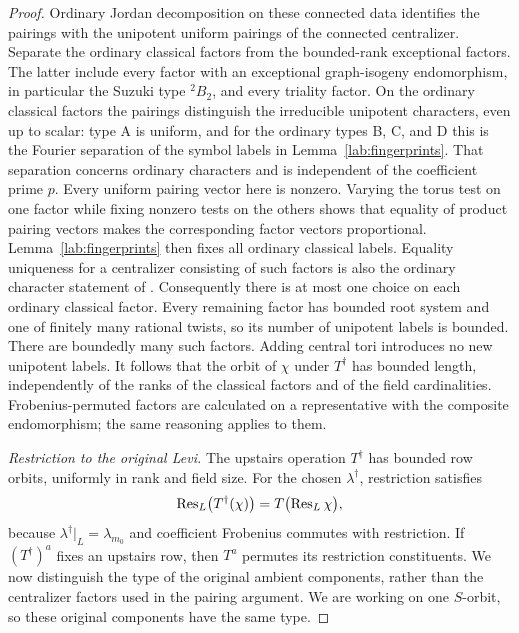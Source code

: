 \begin{proof}
Ordinary Jordan decomposition on these connected data identifies
the pairings with the unipotent uniform pairings of the connected
centralizer.  Separate the ordinary classical factors from the
bounded-rank exceptional factors.  The latter include every factor
with an exceptional graph-isogeny endomorphism, in particular the
Suzuki type \({}^2B_2\), and every triality factor.  On the ordinary
classical factors the pairings distinguish the irreducible unipotent
characters, even up to scalar: type A is uniform, and for the ordinary
types B, C, and D this is the Fourier separation of the symbol labels
in Lemma~\ref{lab:fingerprints}.  That separation concerns ordinary
characters and is independent of the coefficient prime $p$.
Every uniform pairing vector here is nonzero.  Varying the torus
test on one factor while fixing nonzero tests on the others shows
that equality of product pairing vectors makes the corresponding
factor vectors proportional.  Lemma~\ref{lab:fingerprints} then
fixes all ordinary classical labels.  Equality uniqueness for a
centralizer consisting of such factors is also the ordinary character
statement of \cite[Lemma~3.7]{FarrellKessar}.
Consequently there is at most one choice on each ordinary classical
factor.  Every remaining factor has bounded root system and one of
finitely many rational twists, so its number of unipotent labels is
bounded.  There are boundedly many such factors.  Adding central tori
introduces no new unipotent
labels.  It follows that the orbit of $\chi$ under $T^\dagger$ has
bounded length, independently of the ranks of the classical factors
and of the field cardinalities.  Frobenius-permuted factors are
calculated on a representative with the composite endomorphism;
the same reasoning applies to them.

\emph{Restriction to the original Levi.}
The upstairs operation $T^\dagger$ has bounded row orbits,
uniformly in rank and field size.  For the chosen
$\lambda^\dagger$, restriction satisfies
\[
 \operatorname{Res}_L\bigl(T^\dagger(\chi)\bigr)
       =T\bigl(\operatorname{Res}_L\chi\bigr),
\]
because $\lambda^\dagger|_L=\lambda_{m_0}$ and coefficient
Frobenius commutes with restriction.  If $(T^\dagger)^a$ fixes an
upstairs row, then $T^a$ permutes its restriction constituents.  We now
distinguish the type of the original ambient components, rather
than the centralizer factors used in the pairing argument.  We
are working on one $S$-orbit, so these original components have
the same type.


\end{proof}
